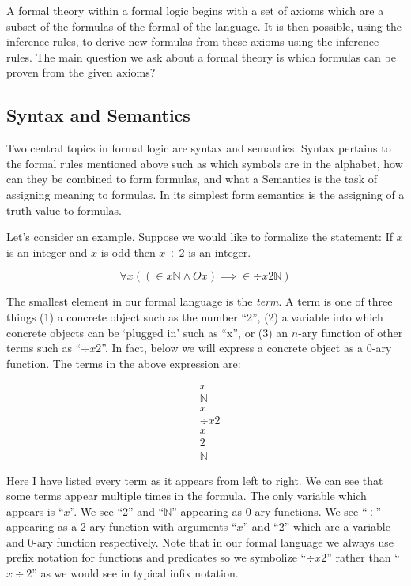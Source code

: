 \documentclass[12pt]{article}
\theoremstyle{break}
\theoremstyle{break}
\theoremstyle{break}
\theoremstyle{break}
\theoremstyle{break}
\newtheorem{informal definition}[definition]{Informal Definition}
\newcommand{\qq}[1]{``#1''}
\begin{document}
A formal theory within a formal logic begins with a set of axioms which are a subset of the formulas of the formal of the language.
It is then possible, using the inference rules, to derive new formulas from these axioms using the inference rules.
The main question we ask about a formal theory is which formulas can be proven from the given axioms?

\subsection{Syntax and Semantics}
Two central topics in formal logic are syntax and semantics.
Syntax pertains to the formal rules mentioned above such as which symbols are in the alphabet, how can they be combined to form formulas, and what a
Semantics is the task of assigning meaning to formulas.
In its simplest form semantics is the assigning of a truth value to formulas.

Let's consider an example.
Suppose we would like to formalize the statement: If $x$ is an integer and $x$ is odd then $x \div 2$ is an integer.

$$
\forall x((\in x \mathbb{N} \land Ox)\implies \in \div x 2 \mathbb{N})
$$

The smallest element in our formal language is the \textit{term}.
A term is one of three things (1) a concrete object such as the number \qq{2}, (2) a variable into which concrete objects can be `plugged in' such as \qq{x}, or (3) an $n$-ary function of other terms such as \qq{$\div x2$}.
In fact, below we will express a concrete object as a 0-ary function.
The terms in the above expression are:

\begin{align*}
& x \\
& \mathbb{N} \\
& x \\
& \div x 2 \\
& x \\
& 2 \\
& \mathbb{N}
\end{align*}

Here I have listed every term as it appears from left to right.
We can see that some terms appear multiple times in the formula.
The only variable which appears is \qq{$x$}.
We see \qq{2} and \qq{$\mathbb{N}$} appearing as 0-ary functions.
We see \qq{$\div$} appearing as a 2-ary function with arguments \qq{$x$} and \qq{2} which are a variable and 0-ary function respectively.
Note that in our formal language we always use prefix notation for functions and predicates so we symbolize \qq{$\div x2$} rather than \qq{$x \div 2$} as we would see in typical infix notation.
\end{document}
